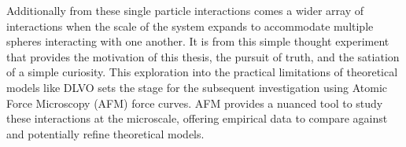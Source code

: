 Additionally from these single particle interactions comes a wider array of interactions when the scale of the system expands to accommodate multiple spheres interacting with one another. It is from this simple thought experiment that provides the motivation of this thesis, the pursuit of truth, and the satiation of a simple curiosity. This exploration into the practical limitations of theoretical models like DLVO sets the stage for the subsequent investigation using Atomic Force Microscopy (AFM) force curves. AFM provides a nuanced tool to study these interactions at the microscale, offering empirical data to compare against and potentially refine theoretical models.


\newpage



